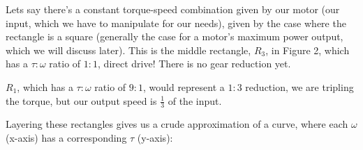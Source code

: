 \documentclass[12pt]{article}
\begin{document}
Lets say there's a constant torque-speed combination given by our motor (our input, which we have to manipulate for our needs), given by the case where the rectangle is a square (generally the case for a motor's maximum power output, which we will discuss later). This is the middle rectangle, $R_{3}$, in Figure 2, which has a $\tau:\omega$ ratio of $1:1$, direct drive! There is no gear reduction yet. 

$R_{1}$, which has a $\tau:\omega$ ratio of $9:1$, would represent a $1:3$ reduction, we are tripling the torque, but our output speed is $\frac{1}{3}$ of the input.

Layering these rectangles gives us a crude approximation of a curve, where each $\omega$ (x-axis) has a corresponding $\tau$ (y-axis):

\begin{figure}[H]
  \centering
\end{figure}
\end{document}
